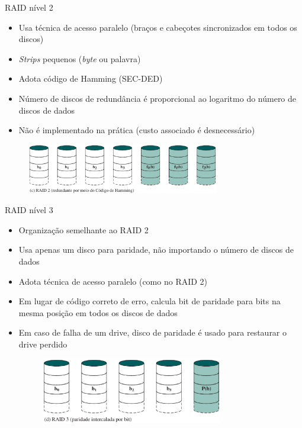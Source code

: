 \begin{slide}{RAID nível 2}
	\begin{itemize}
		\item Usa técnica de acesso paralelo (braços e cabeçotes sincronizados em todos os discos)
		\item \emph{Strips} pequenos (\emph{byte} ou palavra)
		\item Adota código de Hamming (SEC-DED)
		\item Número de discos de redundância é proporcional ao logaritmo do número de discos de dados
		\item Não é implementado na prática (custo associado é desnecessário)
	\end{itemize}

			\begin{figure}[h]
				\centering
				\includegraphics[width=0.75\textwidth]{figs/raid2}
			\end{figure}
\end{slide}

\begin{slide}{RAID nível 3}
	\begin{itemize}
		\item Organização semelhante ao RAID 2
		\item Usa apenas um disco para paridade, não importando o número de discos de dados
	        \item Adota técnica de acesso paralelo (como no RAID 2)
		\item Em lugar de código correto de erro, calcula bit de paridade para bits na mesma posição em todos os discos de dados
		\item Em caso de falha de um drive, disco de paridade é usado para restaurar o drive perdido
			\begin{figure}[h]
				\centering
				\includegraphics[width=0.75\textwidth]{figs/raid3}
			\end{figure}
	\end{itemize}
\end{slide}

